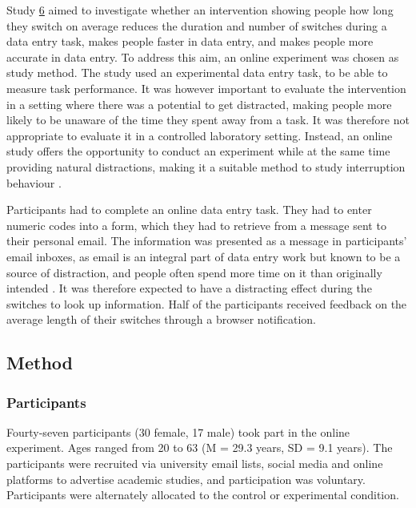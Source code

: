 Study \hyperref[st:Study6]{6} aimed to investigate whether an intervention showing people how long they switch on average reduces the duration and number of switches during a data entry task, makes people faster in data entry, and makes people more accurate in data entry.
To address this aim, an online experiment was chosen as study method. The study used an experimental data entry task, to be able to measure task performance. It was however important to evaluate the intervention in a setting where there was a potential to get distracted, making people more likely to be unaware of the time they spent away from a task. It was therefore not appropriate to evaluate it in a controlled laboratory setting. Instead, an online study offers the opportunity to conduct an experiment while at the same time providing natural distractions, making it a suitable method to study interruption behaviour \citep[e.g.][]{Gould2016a}.

Participants had to complete an online data entry task. They had to enter numeric codes into a form, which they had to retrieve from a message sent to their personal email. The information was presented as a message in participants' email inboxes, as email is an integral part of data entry work but known to be a source of distraction, and people often spend more time on it than originally intended \citep{Hanrahan2015, Mark2016}. It was therefore expected to have a distracting effect during the switches to look up information. Half of the participants received feedback on the average length of their switches through a browser notification. 


\subsection{Method}
\subsubsection{Participants}
Fourty-seven participants (30 female, 17 male) took part in the online experiment. Ages ranged from 20 to 63 (M = 29.3 years, SD = 9.1 years). The participants were recruited via university email lists, social media and online platforms to advertise academic studies, and participation was voluntary. Participants were alternately allocated to the control or experimental condition.

